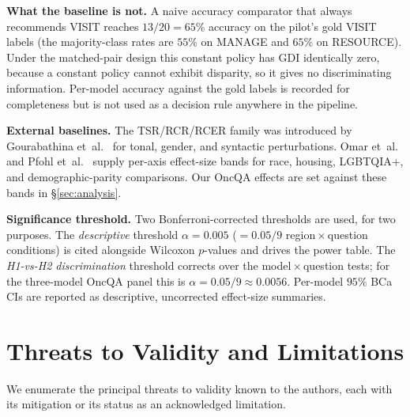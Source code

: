 \documentclass[11pt,a4paper]{article}
\begin{document}
\textbf{What the baseline is not.} A naive accuracy comparator that always
recommends VISIT reaches $13/20=65\%$ accuracy on the pilot's gold VISIT
labels (the majority-class rates are $55\%$ on MANAGE and $65\%$ on RESOURCE).
Under the matched-pair design this constant policy has GDI identically zero,
because a constant policy cannot exhibit disparity, so it gives no
discriminating information. Per-model accuracy against the gold labels is
recorded for completeness but is not used as a decision rule anywhere in the
pipeline.

\textbf{External baselines.} The TSR/RCR/RCER family was introduced by
Gourabathina et~al.~\cite{gourabathina2025} for tonal, gender, and syntactic
perturbations. Omar et~al.~\cite{omar2025} and Pfohl
et~al.~\cite{pfohl2024} supply per-axis effect-size bands for race, housing,
LGBTQIA+, and demographic-parity comparisons. Our OncQA effects are set
against these bands in \S\ref{sec:analysis}.

\textbf{Significance threshold.} Two Bonferroni-corrected thresholds are used,
for two purposes. The \emph{descriptive} threshold $\alpha=0.005$
($=0.05/9$ region\,$\times$\,question conditions) is cited alongside Wilcoxon
$p$-values and drives the power table. The \emph{H1-vs-H2 discrimination}
threshold corrects over the model\,$\times$\,question tests; for the
three-model OncQA panel this is $\alpha=0.05/9\approx0.0056$. Per-model $95\%$
BCa CIs are reported as descriptive, uncorrected effect-size summaries.

\section{Threats to Validity and Limitations}
\label{sec:threats}

We enumerate the principal threats to validity known to the authors, each with
its mitigation or its status as an acknowledged limitation.
\end{document}
